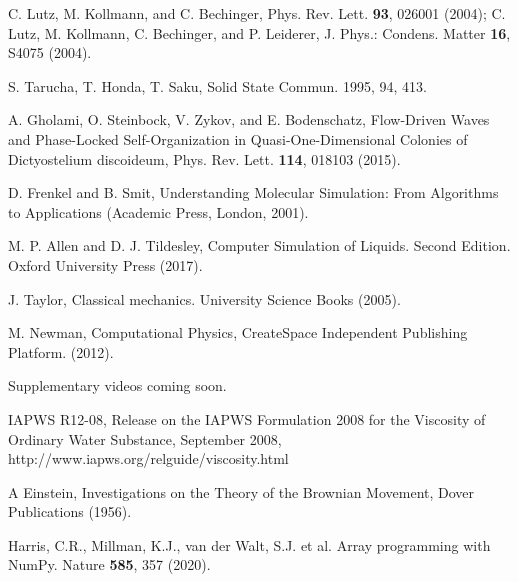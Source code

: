 \documentclass[twocolumn,preprintnumbers,amsmath,amssymb,aps,prx]{revtex4}
\begin{document}
\begin{thebibliography}{99}
     C. Lutz, M. Kollmann, and C. Bechinger, Phys. Rev. Lett. {\bf 93}, 026001 (2004); C. Lutz, M. Kollmann, C. Bechinger, and P. Leiderer, J. Phys.: Condens. Matter {\bf 16}, S4075 (2004).

      S. Tarucha, T. Honda,  T. Saku, Solid State Commun. 1995, 94, 413.

     A. Gholami, O. Steinbock, V. Zykov, and E. Bodenschatz, Flow-Driven Waves and Phase-Locked Self-Organization in Quasi-One-Dimensional Colonies of Dictyostelium discoideum, Phys. Rev. Lett. {\bf 114}, 018103 (2015).


     D. Frenkel and B. Smit, Understanding Molecular Simulation: From Algorithms to Applications (Academic Press, London, 2001).
      
     M. P. Allen and D. J. Tildesley, Computer Simulation of Liquids.  Second Edition. Oxford University Press (2017).

     J. Taylor,  Classical mechanics. University Science Books (2005).

       M. Newman, Computational Physics, CreateSpace Independent Publishing Platform. (2012).
      
       Supplementary videos coming soon.

  IAPWS R12-08, 
  Release on the IAPWS Formulation 2008 for the Viscosity of Ordinary Water Substance, 
  September 2008, 
  http://www.iapws.org/relguide/viscosity.html

   A Einstein, Investigations on the Theory of the Brownian Movement,  Dover Publications (1956).

     Harris, C.R., Millman, K.J., van der Walt, S.J. et al. Array programming with NumPy. Nature {\bf 585}, 357 (2020). %
    


\end{thebibliography}
\end{document}
